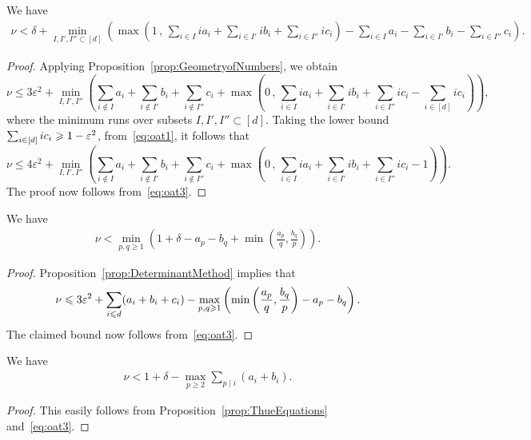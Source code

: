 \begin{proposition} \label{prop:GeometryBound}
We have
\begin{align*}
\nu < \delta + \min_{I,I',I''\subset [d]} \left(
\max\left( 1 \,,\, \sum_{i\in I} ia_i +\sum_{i\in I'} ib_i + \sum_{i\in I''} ic_i\right) - \sum_{i\in I} a_i -\sum_{i\in I'} b_i - \sum_{i\in I''} c_i\right).
\end{align*}
\end{proposition}
\begin{proof}
Applying Proposition~\ref{prop:GeometryofNumbers}, we obtain
\[
\nu \leq 3\varepsilon^2+
\min_{I,I',I''}
 \left( \sum_{i\notin I} a_i +\sum_{i\notin I'} b_i + \sum_{i\notin I''} c_i +
\max\left( 0 \,,\, \sum_{i\in I} ia_i +\sum_{i\in I'} ib_i + \sum_{i\in I''} ic_i-
\sum_{i\in [d]} ic_i
\right)\right) ,
\]
where the minimum runs over subsets
$I,I',I''\subset[d]$. Taking the lower bound
$\sum_{i\in [d]} ic_i\geqslant 1-\varepsilon^2$,
 from~\eqref{eq:oat1},
 it follows that
\begin{equation}
\nu
\leq 4\varepsilon^2+
\min_{I,I',I''}
 \left( \sum_{i\notin I} a_i +\sum_{i\notin I'} b_i + \sum_{i\notin I''} c_i+
\max\left( 0 \,,\, \sum_{i\in I} ia_i +\sum_{i\in I'} ib_i + \sum_{i\in I''} ic_i-1\right)\right).\label{eq:Geoalt}
\end{equation}
The proof now follows from~\eqref{eq:oat3}.
\end{proof}


\begin{proposition} \label{prop:DeterminantBound}
We have
\begin{align*}
\nu < \min_{p,q\ge1} \left( 1+\delta- a_p - b_q +\min\left(\frac{a_p}{q}, \frac{b_q}{p}\right)\right).
\end{align*}
\end{proposition}
\begin{proof}
Proposition~\ref{prop:DeterminantMethod} implies
that
\[
\nu\leqslant 3\varepsilon^2+
\sum_{i\leqslant d} (a_i+b_i+c_i)
-\max_{p,q\geqslant 1} \left(\min\left(
\frac{a_p}{q}, \frac{b_q}{p}\right)
-a_p-b_q\right).
\]
The claimed bound now follows from~\eqref{eq:oat3}.
\end{proof}


\begin{proposition} \label{prop:ThueBound}
We have
\begin{align*}
\nu < 1 +\delta- \max_{p\ge2}\sum_{p\mid i}(a_i+b_i).
\end{align*}
\end{proposition}
\begin{proof}
This easily follows from Proposition~\ref{prop:ThueEquations} and~\eqref{eq:oat3}.
\end{proof}



